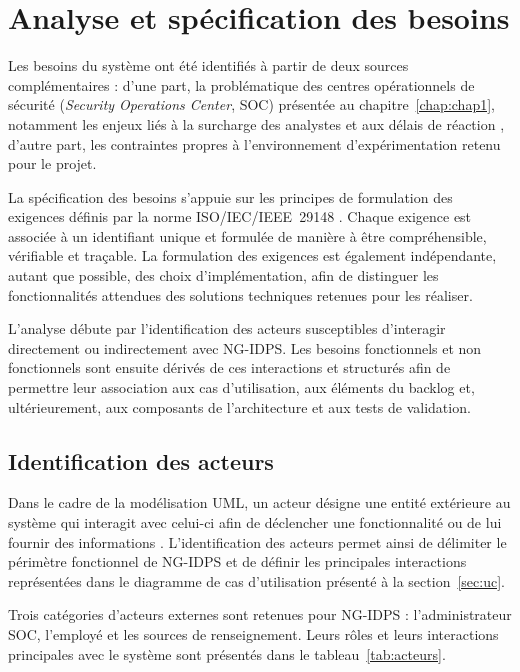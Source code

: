 \section{Analyse et spécification des besoins}
\label{sec:besoins}

Les besoins du système ont été identifiés à partir de deux sources complémentaires : d'une part, la problématique des centres opérationnels de sécurité (\textit{Security Operations Center}, SOC) présentée au chapitre~\ref{chap:chap1}, notamment les enjeux liés à la surcharge des analystes et aux délais de réaction \cite{vielberth2020soc}, d'autre part, les contraintes propres à l'environnement d'expérimentation retenu pour le projet.

La spécification des besoins s'appuie sur les principes de formulation des exigences définis par la norme ISO/IEC/IEEE~29148 \cite{iso29148}. Chaque exigence est associée à un identifiant unique et formulée de manière à être compréhensible, vérifiable et traçable. La formulation des exigences est également indépendante, autant que possible, des choix d'implémentation, afin de distinguer les fonctionnalités attendues des solutions techniques retenues pour les réaliser.

L'analyse débute par l'identification des acteurs susceptibles d'interagir directement ou indirectement avec NG-IDPS. Les besoins fonctionnels et non fonctionnels sont ensuite dérivés de ces interactions et structurés afin de permettre leur association aux cas d'utilisation, aux éléments du backlog et, ultérieurement, aux composants de l'architecture et aux tests de validation.


\subsection{Identification des acteurs}
\label{sec:acteurs}

Dans le cadre de la modélisation UML, un acteur désigne une entité extérieure au système qui interagit avec celui-ci afin de déclencher une fonctionnalité ou de lui fournir des informations \cite{omg2017uml}. L'identification des acteurs permet ainsi de délimiter le périmètre fonctionnel de NG-IDPS et de définir les principales interactions représentées dans le diagramme de cas d'utilisation présenté à la section~\ref{sec:uc}.

Trois catégories d'acteurs externes sont retenues pour NG-IDPS : l'administrateur SOC, l'employé et les sources de renseignement. Leurs rôles et leurs interactions principales avec le système sont présentés dans le tableau~\ref{tab:acteurs}.

